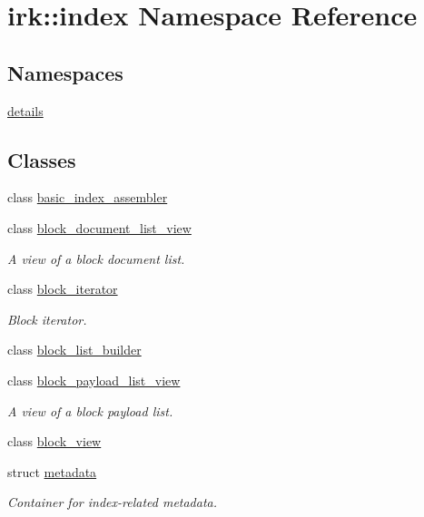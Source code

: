 \hypertarget{namespaceirk_1_1index}{}\section{irk\+:\+:index Namespace Reference}
\label{namespaceirk_1_1index}
\subsection*{Namespaces}
\begin{DoxyCompactItemize}
\item 
 \mbox{\hyperlink{namespaceirk_1_1index_1_1details}{details}}
\end{DoxyCompactItemize}
\subsection*{Classes}
\begin{DoxyCompactItemize}
\item 
class \mbox{\hyperlink{classirk_1_1index_1_1basic__index__assembler}{basic\+\_\+index\+\_\+assembler}}
\item 
class \mbox{\hyperlink{classirk_1_1index_1_1block__document__list__view}{block\+\_\+document\+\_\+list\+\_\+view}}
\begin{DoxyCompactList}\small\item\em A view of a block document list. \end{DoxyCompactList}\item 
class \mbox{\hyperlink{classirk_1_1index_1_1block__iterator}{block\+\_\+iterator}}
\begin{DoxyCompactList}\small\item\em Block iterator. \end{DoxyCompactList}\item 
class \mbox{\hyperlink{classirk_1_1index_1_1block__list__builder}{block\+\_\+list\+\_\+builder}}
\item 
class \mbox{\hyperlink{classirk_1_1index_1_1block__payload__list__view}{block\+\_\+payload\+\_\+list\+\_\+view}}
\begin{DoxyCompactList}\small\item\em A view of a block payload list. \end{DoxyCompactList}\item 
class \mbox{\hyperlink{classirk_1_1index_1_1block__view}{block\+\_\+view}}
\item 
struct \mbox{\hyperlink{structirk_1_1index_1_1metadata}{metadata}}
\begin{DoxyCompactList}\small\item\em Container for index-\/related metadata. \end{DoxyCompactList}\end{DoxyCompactItemize}
